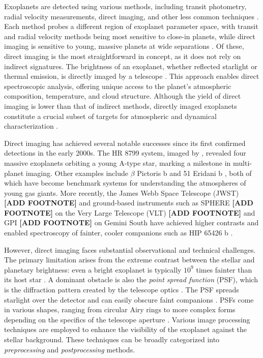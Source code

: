 \documentclass[preprint,longauthor]{aastex631}
\numberwithin{equation}{section}
\begin{document}
Exoplanets are detected using various methods, including transit photometry, radial velocity measurements, direct imaging, and other less common techniques \citep{weiSurveyExoplanetaryDetection2018}. Each method probes a different region of exoplanet parameter space, with transit and radial velocity methods being most sensitive to close-in planets, while direct imaging is sensitive to young, massive planets at wide separations \citep{fischerExoplanetDetectionTechniques2014b}. Of these, direct imaging is the most straightforward in concept, as it does not rely on indirect signatures. The brightness of an exoplanet, whether reflected starlight or thermal emission, is directly imaged by a telescope \citep{kaushikExoplanetDetectionDetailed2025}. This approach enables direct spectroscopic analysis, offering unique access to the planet’s atmospheric composition, temperature, and cloud structure. Although the yield of direct imaging is lower than that of indirect methods, directly imaged exoplanets constitute a crucial subset of targets for atmospheric and dynamical characterization \citep{currieDirectImagingSpectroscopy2023}.

Direct imaging has achieved several notable successes since its first confirmed detections in the early 2000s. The HR 8799 system, imaged by \citet{maroisDirectImagingMultiple2008}, revealed four massive exoplanets orbiting a young A-type star, marking a milestone in multi-planet imaging. Other examples include $\beta$ Pictoris b \citep{lagrangeGiantPlanetImaged2010} and 51 Eridani b \citep{macintoshDiscoverySpectroscopyYoung2015}, both of which have become benchmark systems for understanding the atmospheres of young gas giants. More recently, the James Webb Space Telescope (JWST) \textbf{[ADD FOOTNOTE]} and ground-based instruments such as SPHERE \textbf{[ADD FOOTNOTE]} on the Very Large Telescope (VLT) \textbf{[ADD FOOTNOTE]} and GPI \textbf{[ADD FOOTNOTE]} on Gemini South have achieved higher contrasts and enabled spectroscopy of fainter, cooler companions such as HIP 65426 b \citep{carterJWSTEarlyRelease2023}.

However, direct imaging faces substantial observational and technical challenges. The primary limitation arises from the extreme contrast between the stellar and planetary brightness: even a bright exoplanet is typically $10^{9}$ times fainter than its host star \citep{fischerExoplanetDetectionTechniques2014b}. A dominant obstacle is also the \textit{point spread function} (PSF), which is the diffraction pattern created by the telescope optics \citep{fischerExoplanetDetectionTechniques2014b}. The PSF spreads starlight over the detector and can easily obscure faint companions \citep{fischerExoplanetDetectionTechniques2014b}. PSFs come in various shapes, ranging from circular Airy rings to more complex forms depending on the specifics of the telescope aperture \citep{fischerExoplanetDetectionTechniques2014b}. Various image processing techniques are employed to enhance the visibility of the exoplanet against the stellar background. These techniques can be broadly categorized into \textit{preprocessing} and \textit{postprocessing} methods.
\end{document}
